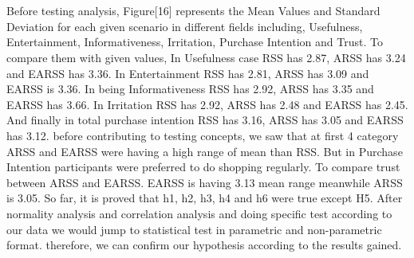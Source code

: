 \documentclass[letterpaper, 10 pt, conference]{ieeeconf}
\begin{document}
\begin{strip}
    \\\\\\\\\\\\\\\\\\\\\\\\\\\\\\\\\\\\\\Before testing analysis, Figure[16] represents the Mean Values and Standard Deviation for each given scenario in different fields including, Usefulness, Entertainment, Informativeness, Irritation, Purchase Intention and Trust. To compare them with given values, In Usefulness case RSS has 2.87, ARSS has 3.24 and EARSS has 3.36. In Entertainment RSS has 2.81, ARSS has 3.09 and EARSS is 3.36. In being Informativeness RSS has 2.92, ARSS has 3.35 and EARSS has 3.66. In Irritation RSS has 2.92, ARSS has 2.48 and EARSS has 2.45. And finally in total purchase intention RSS has 3.16, ARSS has 3.05 and EARSS has 3.12. before contributing to testing concepts, we saw that at first 4 category ARSS and EARSS were having a high range of mean than RSS. But  in Purchase Intention participants were preferred to do shopping regularly. To compare trust between ARSS and EARSS. EARSS is having 3.13 mean range meanwhile ARSS is 3.05. So far, it is proved that h1, h2, h3, h4 and h6 were true except H5. After normality analysis and correlation analysis and doing specific test according to our data we would jump to statistical test in parametric and non-parametric format. therefore, we can confirm our hypothesis according to the results gained. \\\\\\\\\\\\\\\\\\\\
\end{strip}
\end{document}
